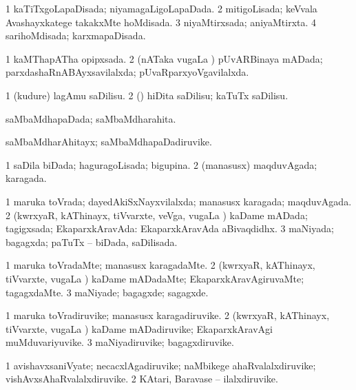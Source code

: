 \bentry
{} 
\gl{\gu}
\expl{}
\bmng
\bnum
\num{1} kaTiTxgoLapaDisada; niyamagaLigoLapaDada. 
\num{2} mitigoLisada; keVvala Avashayxkatege takakxMte hoMdisada. 
\num{3} niyaMtirxsada; aniyaMtirxta. 
\num{4} sarihoMdisada; karxmapaDisada. 
\enum
\emng
\eentry

\bentry
{} 
\gl{\gu}
\expl{}
\bmng
\bnum
\num{1} kaMThapATha opipxsada. 
\num{2} (nATaka \mo vugaLa \vi) pUvARBinaya mADada; parxdashaRnABAyxsavilalxda; pUvaRparxyoVgavilalxda. 
\enum
\emng
\eentry

\bentry
{} 
\gl{\sakirx}
\expl{}
\bmng
\bnum
\num{1} (kudure) lagAmu saDilisu. 
\num{2} (\rUpa) hiDita saDilisu; kaTuTx saDilisu. 
\enum
\emng
\eentry

\bentry
{} 
\gl{\gu}
\expl{}
\bmng
saMbaMdhapaDada; saMbaMdharahita. 
\emng
\eentry

\bentry
{} 
\gl{\nA}
\expl{}
\bmng
saMbaMdharAhitayx; saMbaMdhapaDadiruvike. 
\emng
\eentry

\bentry
{} 
\gl{\gu}
\expl{}
\bmng
\bnum
\num{1} saDila biDada; haguragoLisada; bigupina. 
\num{2} (manasusx) maqduvAgada; karagada. 
\enum
\emng
\eentry

\bentry
{} 
\gl{\gu}
\expl{}
\bmng
\bnum
\num{1} maruka toVrada; dayedAkiSxNayxvilalxda; manasusx karagada; maqduvAgada. 
\num{2} (kwrxyaR, kAThinayx, tiVvarxte, veVga, \mo vugaLa \vi) kaDame mADada; tagigxsada; EkaparxkAravAda:  EkaparxkAravAda aBivaqdidhx. 
\num{3} maNiyada; bagagxda; paTuTx -- biDada, saDilisada. 
\enum
\emng
\eentry

\bentry
{} 
\gl{\kirxvi}
\expl{}
\bmng
\bnum
\num{1} maruka toVradaMte; manasusx karagadaMte. 
\num{2} (kwrxyaR, kAThinayx, tiVvarxte, \mo vugaLa \vi) kaDame mADadaMte; EkaparxkAravAgiruvaMte; tagagxdaMte. 
\num{3} maNiyade; bagagxde; sagagxde. 
\enum
\emng
\eentry

\bentry
{} 
\gl{\nA}
\expl{}
\bmng
\bnum
\num{1} maruka toVradiruvike; manasusx karagadiruvike. 
\num{2} (kwrxyaR, kAThinayx, tiVvarxte, \mo vugaLa \vi) kaDame mADadiruvike; EkaparxkAravAgi muMduvariyuvike. 
\num{3} maNiyadiruvike; bagagxdiruvike. 
\enum
\emng
\eentry

\bentry
{} 
\gl{\nA}
\expl{}
\bmng
\bnum
\num{1} avishavxsaniVyate; necacxlAgadiruvike; naMbikege ahaRvalalxdiruvike; vishAvxsAhaRvalalxdiruvike. 
\num{2} KAtari, Baravase -- ilalxdiruvike. 
\enum
\emng
\eentry

